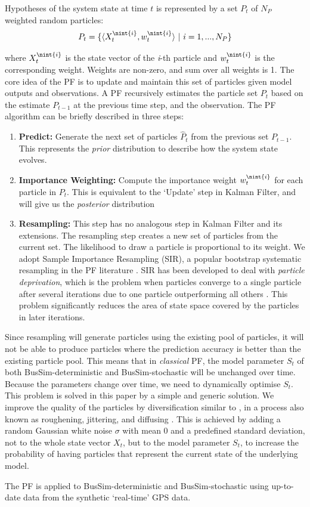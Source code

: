 Hypotheses of the system state at time $t$ is represented by a set $P_t$ of $N_P$ weighted random particles: 
\begin{equation} 
    P_t =  \{  \langle X_t^{\nint{i}}, w_t^{\nint{i}} \rangle \ | \ i=1,...,N_P \}
\label{eq:system_state_particle}
\end{equation}

where $X_t^{\nint{i}}$ is the state vector of the \textit{i}-th particle and $w_t^{\nint{i}}$ is the corresponding weight. Weights are non-zero, and sum over all weights is 1. The core idea of the PF is to update and maintain this set of particles given model outputs and observations. A PF recursively estimates the particle set $P_t$ based on the estimate $P_{t-1}$ at the previous time step, and the observation. The PF algorithm can be briefly described in three steps:
\begin{enumerate}
	
    \item \textbf{Predict:} Generate the next set of particles $\hat{P}_t$ from the previous set $P_{t-1}$. This represents the \textit{prior} distribution to describe how the system state evolves. 
    \item \textbf{Importance Weighting:} Compute the importance weight $w_t^{\nint{i}}$ for each particle in $P_t$. This is equivalent to the `Update' step in Kalman Filter, and will give us the \textit{posterior} distribution 
    \item \textbf{Resampling:} This step has no analogous step in Kalman Filter and its extensions. The resampling step creates a new set of particles from the current set. The likelihood to draw a particle is proportional to its weight. We adopt Sample Importance Resampling (SIR), a popular bootstrap systematic resampling in the PF literature \citep{wang_data_2015, carrassi_data_2018}. SIR has been developed to deal with \textit{particle deprivation}, which is the problem when particles converge to a single particle after several iterations due to one particle outperforming all others \citep{kong_sequential_1994}. This problem significantly reduces the area of state space covered by the particles in later iterations. 
\end{enumerate}
    Since resampling will generate particles using the existing pool of particles, it will not be able to produce particles where the prediction accuracy is better than the existing particle pool. This means that in \textit{classical} PF, the model parameter $S_t$ of both BusSim-deterministic and BusSim-stochastic will be unchanged over time. Because the  parameters change over time, we need to dynamically optimise $S_t$. This problem is solved in this paper by a simple and generic solution. We improve the quality of the particles by diversification similar to \citep{vadakkepat_improved_2006}, in a process also known as roughening, jittering, and diffusing \citep{pantrigo_combining_2005}. This is achieved by adding a random Gaussian white noise $\sigma$ with mean 0 and a predefined standard deviation, not to the whole state vector $X_t$, but to the model parameter $S_t$, to increase the probability of having particles that represent the current state of the underlying model. 
    
The PF is applied to BusSim-deterministic and BusSim-stochastic using up-to-date data from the synthetic `real-time' GPS data. 

